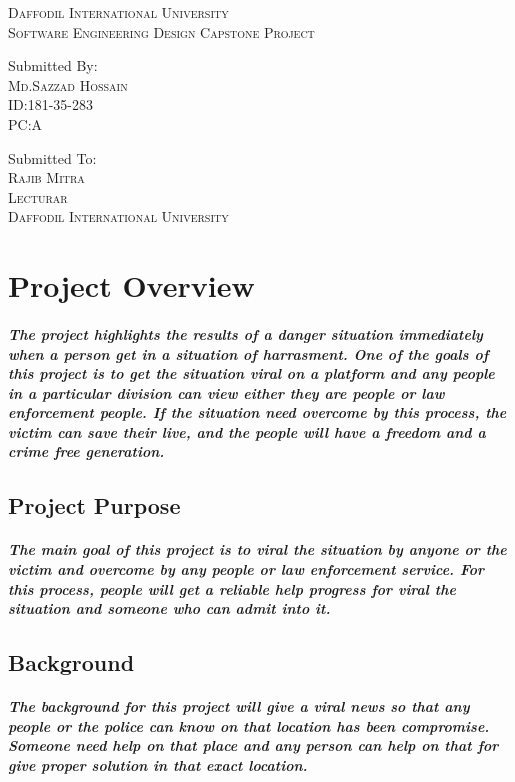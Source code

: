 \documentclass{article}
\begin{document}
\textsc{\LARGE Daffodil International University}\\[1cm]
\textsc{\large Software Engineering Design Capstone Project}



\vspace*{3\baselineskip}
Submitted By:
\vspace{0.1\baselineskip}
{\scshape\Large\\ Md.Sazzad Hossain\\ ID:181-35-283\\ PC:A}
\vspace{0.5\baselineskip}

\vspace*{3\baselineskip}
Submitted To:
\vspace{0.1\baselineskip}
{\scshape\Large \\Rajib Mitra\\ Lecturar \\Daffodil International University}
\vspace{0.5\baselineskip}



 \newpage

\section{Project Overview}
\subparagraph{ The project highlights the results of a danger situation immediately when a person get in a situation of  harrasment. One of the goals of this project is to get the situation viral on a platform and any people in a particular division can view either they are people or law enforcement people. If the situation need overcome by this process, the victim can save their live, and the people will have a freedom and a crime free generation.}

\subsection{Project Purpose}
\subparagraph{The main goal of this project is to viral the situation by anyone or the victim  and overcome by any people or law enforcement service. For this process, people will get a reliable help progress for viral the situation and someone who can admit into it. }
 
\subsection{Background}
\subparagraph{The background for this project will give a viral news so that any people or the police can know  on that location has been compromise. Someone need help on that place and any person can help on that for give proper solution in that exact location.}
\end{document}

